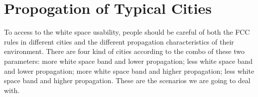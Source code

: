 \section{Propogation of Typical Cities}
\label{sec:cities}


To access to the white space usability, people should be careful of both the FCC rules in different cities and the different propagation characteristics of their environment.
There are four kind of cities according to the combo of these two parameters: 
more white space band and lower propagation; less white space band and lower propagation; more white space band and higher propagation; less white space band and higher propagation.
These are the scenarios we are going to deal with.


